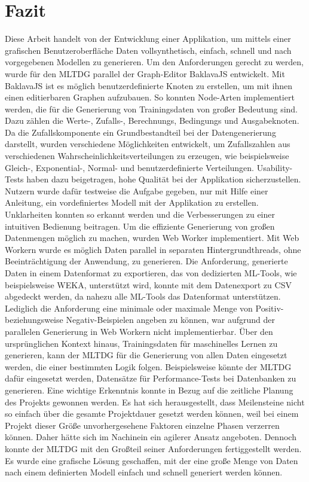 
\chapter{Fazit}

Diese Arbeit handelt von der Entwicklung einer Applikation, um mittels einer grafischen Benutzeroberfläche Daten vollsynthetisch, einfach, schnell und nach vorgegebenen Modellen zu generieren. Um den Anforderungen gerecht zu werden, wurde für den \ac{MLTDG} parallel der Graph-Editor BaklavaJS entwickelt. Mit BaklavaJS ist es möglich benutzerdefinierte Knoten zu erstellen, um mit ihnen einen editierbaren Graphen aufzubauen. So konnten Node-Arten implementiert werden, die für die Generierung von Trainingsdaten von großer Bedeutung sind. Dazu zählen die Werte-, Zufalls-, Berechnungs, Bedingungs und Ausgabeknoten. Da die Zufallskomponente ein Grundbestandteil bei der Datengenerierung darstellt, wurden verschiedene Möglichkeiten entwickelt, um Zufallszahlen aus verschiedenen Wahrscheinlichkeitsverteilungen zu erzeugen, wie beispielsweise Gleich-, Exponential-, Normal- und benutzerdefinierte Verteilungen. Usability-Tests haben dazu beigetragen, hohe Qualität bei der Applikation sicherzustellen. Nutzern wurde dafür testweise die Aufgabe gegeben, nur mit Hilfe einer Anleitung, ein vordefiniertes Modell mit der Applikation zu erstellen. Unklarheiten konnten so erkannt werden und die Verbesserungen zu einer intuitiven Bedienung beitragen. Um die effiziente Generierung von großen Datenmengen möglich zu machen, wurden Web Worker implementiert. Mit Web Workern wurde es möglich Daten parallel in separaten Hintergrundthreads, ohne Beeinträchtigung der Anwendung, zu generieren. Die Anforderung, generierte Daten in einem Datenformat zu exportieren, das von dedizierten \ac{ML}-Tools, wie beispielsweise WEKA, unterstützt wird, konnte mit dem Datenexport zu \ac{CSV} abgedeckt werden, da nahezu alle \ac{ML}-Tools das Datenformat unterstützen. Lediglich die Anforderung eine minimale oder maximale Menge von Positiv- beziehungsweise Negativ-Beispielen angeben zu können, war aufgrund der parallelen Generierung in Web Workern nicht implementierbar. Über den ursprünglichen Kontext hinaus, Trainingsdaten für maschinelles Lernen zu generieren, kann der \ac{MLTDG} für die Generierung von allen Daten eingesetzt werden, die einer bestimmten Logik folgen. Beispielsweise könnte der \ac{MLTDG} dafür eingesetzt werden, Datensätze für Performance-Tests bei Datenbanken zu generieren. Eine wichtige Erkenntnis konnte in Bezug auf die zeitliche Planung des Projekts gewonnen werden. Es hat sich herausgestellt, dass Meilensteine nicht so einfach über die gesamte Projektdauer gesetzt werden können, weil bei einem Projekt dieser Größe unvorhergesehene Faktoren einzelne Phasen verzerren können. Daher hätte sich im Nachinein ein agilerer Ansatz angeboten. Dennoch konnte der \ac{MLTDG} mit den Großteil seiner Anforderungen fertiggestellt werden. Es wurde eine grafische Lösung geschaffen, mit der eine große Menge von Daten nach einem definierten Modell einfach und schnell generiert werden können. 